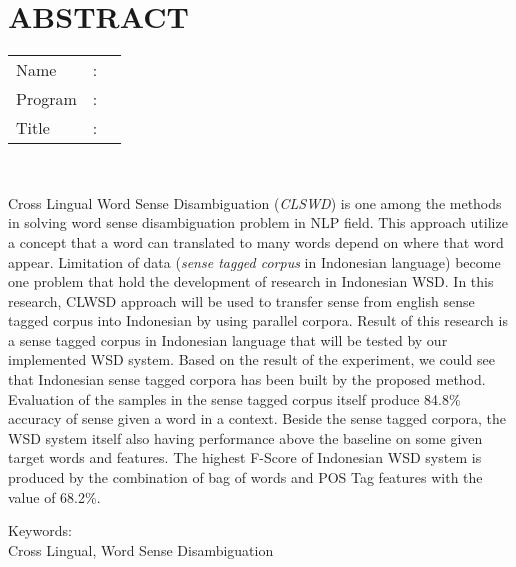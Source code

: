 %
%
%

\chapter*{ABSTRACT}

\vspace*{0.2cm}

\noindent \begin{tabular}{l l p{11.0cm}}
	Name&: & \penulis \\
	Program&: & \programEng \\
	Title&: & \judulInggris \\
\end{tabular} \\ 

\vspace*{0.5cm}

\noindent 
Cross Lingual Word Sense Disambiguation (\textit{CLSWD}) is one among the methods in solving word sense disambiguation problem in NLP field. This approach utilize a concept that a word can translated to many words depend on where that word appear. Limitation of data (\textit{sense tagged corpus} in Indonesian language) become one problem that hold the development of research in Indonesian WSD. In this research, CLWSD approach will be used to transfer sense from english sense tagged corpus into Indonesian by using parallel corpora. Result of this research is a sense tagged corpus in Indonesian language that will be tested by our implemented WSD system. Based on the result of the experiment, we could see that Indonesian sense tagged corpora has been built by the proposed method. Evaluation of the samples in the sense tagged corpus itself produce 84.8\% accuracy of sense given a word in a context. Beside the sense tagged corpora, the WSD system itself also having performance above the baseline on some given target words and features. The highest F-Score of Indonesian WSD system is produced by the combination of bag of words and POS Tag features with the value of 68.2\%.
\vspace*{0.2cm}

\noindent Keywords: \\ 
\noindent Cross Lingual, Word Sense Disambiguation

\newpage